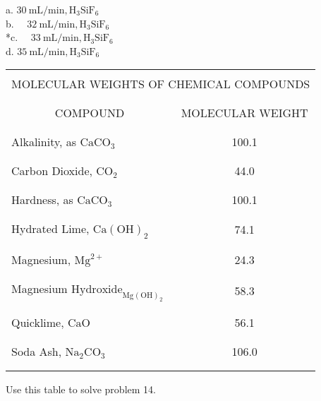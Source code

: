 \begin{enumerate}
a. $30 \mathrm{~mL} / \mathrm{min}, \mathrm{H}_{3} \mathrm{SiF}_{6}$\\
b. $\quad 32 \mathrm{~mL} / \mathrm{min}, \mathrm{H}_{3} \mathrm{SiF}_{6}$\\
*c. $\quad 33 \mathrm{~mL} / \mathrm{min}, \mathrm{H}_{3} \mathrm{SiF}_{6}$\\
d. $35 \mathrm{~mL} / \mathrm{min}, \mathrm{H}_{3} \mathrm{SiF}_{6}$\\
\begin{center}
\begin{tabular}{|l|c|}
\hline\\
\multicolumn{2}{|c|}{MOLECULAR WEIGHTS OF CHEMICAL COMPOUNDS} \\\\
\hline\\
\multicolumn{1}{|c|}{COMPOUND} & MOLECULAR WEIGHT \\\\
\hline\\
Alkalinity, as $\mathrm{CaCO}_{3}$ & 100.1 \\\\
\hline\\
Carbon Dioxide, $\mathrm{CO}_{2}$ & 44.0 \\\\
\hline\\
Hardness, as $\mathrm{CaCO}_{3}$ & 100.1 \\\\
\hline\\
Hydrated Lime, $\mathrm{Ca}(\mathrm{OH})_{2}$ & 74.1 \\\\
\hline\\
Magnesium, $\mathrm{Mg}^{2+}$ & 24.3 \\\\
\hline\\
Magnesium $\mathrm{Hydroxide}_{\mathrm{Mg}(\mathrm{OH})_{2}}$ & 58.3 \\\\
\hline\\
Quicklime, $\mathrm{CaO}$ & 56.1 \\\\
\hline\\
Soda Ash, $\mathrm{Na}_{2} \mathrm{CO}_{3}$ & 106.0 \\\\
\hline\\
\end{tabular}
\end{center}
Use this table to solve problem 14.\\

\end{enumerate}
